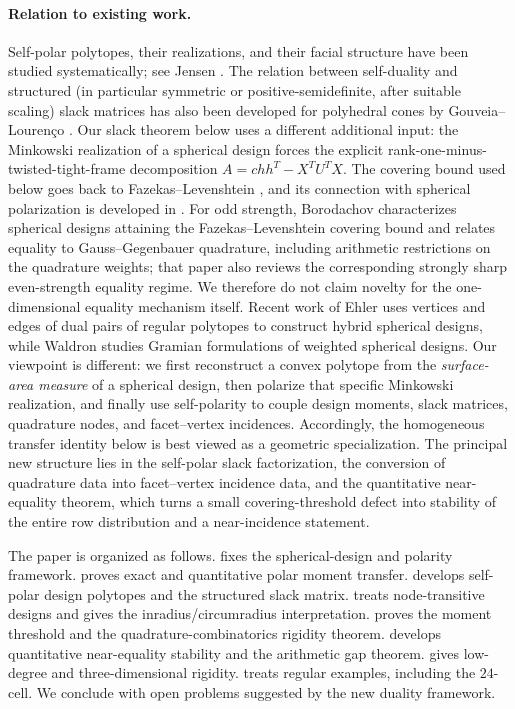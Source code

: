 \documentclass[11pt]{amsart}
\theoremstyle{definition}
\theoremstyle{remark}
\begin{document}
\paragraph{Relation to existing work.}
Self-polar polytopes, their realizations, and their facial structure have been studied systematically; see Jensen \cite{Jensen2021}.  The relation between self-duality and structured (in particular symmetric or positive-semidefinite, after suitable scaling) slack matrices has also been developed for polyhedral cones by Gouveia--Louren\c{c}o \cite{GouveiaLourenco2023}.  Our slack theorem below uses a different additional input: the Minkowski realization of a spherical design forces the explicit rank-one-minus-twisted-tight-frame decomposition $A=c hh^T-X^TU^TX$.  The covering bound used below goes back to Fazekas--Levenshtein \cite{FazekasLevenshtein1995}, and its connection with spherical polarization is developed in \cite{BoyvalenkovEtAl2023}.  For odd strength, Borodachov \cite{Borodachov2024} characterizes spherical designs attaining the Fazekas--Levenshtein covering bound and relates equality to Gauss--Gegenbauer quadrature, including arithmetic restrictions on the quadrature weights; that paper also reviews the corresponding strongly sharp even-strength equality regime.  We therefore do not claim novelty for the one-dimensional equality mechanism itself.  Recent work of Ehler \cite{Ehler2025} uses vertices and edges of dual pairs of regular polytopes to construct hybrid spherical designs, while Waldron \cite{Waldron2025} studies Gramian formulations of weighted spherical designs.  Our viewpoint is different: we first reconstruct a convex polytope from the \emph{surface-area measure} of a spherical design, then polarize that specific Minkowski realization, and finally use self-polarity to couple design moments, slack matrices, quadrature nodes, and facet--vertex incidences.  Accordingly, the homogeneous transfer identity below is best viewed as a geometric specialization.  The principal new structure lies in the self-polar slack factorization, the conversion of quadrature data into facet--vertex incidence data, and the quantitative near-equality theorem, which turns a small covering-threshold defect into stability of the entire row distribution and a near-incidence statement.

The paper is organized as follows.   fixes the spherical-design and polarity framework.   proves exact and quantitative polar moment transfer.   develops self-polar design polytopes and the structured slack matrix.   treats node-transitive designs and gives the inradius/circumradius interpretation.   proves the moment threshold and the quadrature-combinatorics rigidity theorem.   develops quantitative near-equality stability and the arithmetic gap theorem.   gives low-degree and three-dimensional rigidity.   treats regular examples, including the $24$-cell.  We conclude with open problems suggested by the new duality framework.
\end{document}
